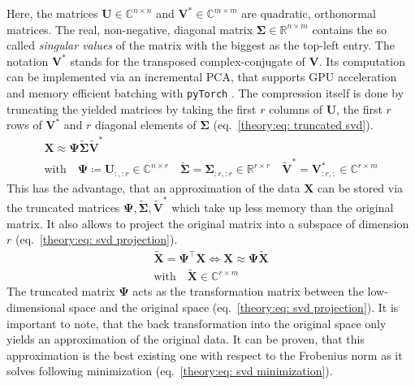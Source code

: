 \noindent
Here, the matrices $\bm{U} \in \mathbb{C}^{n \times n}$ and $\bm{V}^* \in \mathbb{C}^{m \times m}$ are quadratic, orthonormal matrices.
The real, non-negative, diagonal matrix $\bm{\Sigma} \in \mathbb{R}^{n \times m}$ contains the so called \emph{singular values} of the matrix
with the biggest as the top-left entry. The notation $\bm{V}^*$ stands for the transposed complex-conjugate of $\bm{V}$.
Its computation can be implemented via an incremental PCA, that supports GPU acceleration and memory efficient batching
with \texttt{pyTorch} \cite{pytorch2019, incrementalpca2025}.
The compression itself is done by truncating the yielded matrices by taking the first $r$ columns of $\bm{U}$, the
first $r$ rows of $\bm{V}^*$ and $r$ diagonal elements of $\bm{\Sigma}$ (eq.~\ref{theory:eq: truncated svd}).
\begin{equation}
    \label{theory:eq: truncated svd}
    \begin{gathered}
        \bm{X} \approx \bm{\Psi} \bm{\tilde{\Sigma}} \bm{\tilde{V}}^* \\
        \text{with} \quad \bm{\Psi} \coloneq \bm{U}_{:,:r} \in \mathbb{C}^{n \times r}
        \quad \bm{\tilde{\Sigma}} = \bm{\Sigma}_{:r,:r} \in \mathbb{R}^{r \times r}
        \quad \bm{\tilde{V}}^* = \bm{V}^*_{:r,:} \in \mathbb{C}^{r \times m}
    \end{gathered}
\end{equation}
This has the advantage, that an approximation of the data $\bm{X}$ can be stored via the truncated matrices $\bm{\Psi}, \bm{\tilde{\Sigma}}, \bm{\tilde{V}}^*$
which take up less memory than the original matrix. It also allows to project the original matrix into a subspace
of dimension $r$ (eq.~\ref{theory:eq: svd projection}).
\begin{equation}
    \label{theory:eq: svd projection}
        \begin{gathered}
            \bm{\tilde{X}} = \bm{\Psi}^\top \bm{X} \Longleftrightarrow \bm{X} \approx \bm{\Psi} \bm{\tilde{X}} \\
            \text{with} \quad \bm{\tilde{X}} \in \mathbb{C}^{r \times m}
        \end{gathered}
\end{equation}
The truncated matrix $\bm{\Psi}$ acts as the transformation matrix between the low-dimensional space and the original space (eq.~\ref{theory:eq: svd projection}).
It is important to note, that the back transformation into the original space only yields an approximation of the original data.
It can be proven, that this approximation is the best existing one with respect to the Frobenius norm as it solves following minimization \cite{Brunton2019} (eq.~\ref{theory:eq: svd minimization}).
